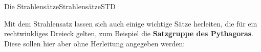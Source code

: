 \begin{MXContent}{Die Strahlens\"atze}{Strahlens\"atze}{STD}
\begin{MInfo}
\begin{itemize}
\end{itemize}
\end{MInfo}




Mit dem Strahlensatz lassen sich auch einige wichtige S\"atze herleiten, die f\"ur ein rechtwinkliges Dreieck gelten, zum Beispiel die \textbf{Satzgruppe des Pythagoras}. Diese sollen hier aber ohne Herleitung angegeben werden:


\end{MXContent}
